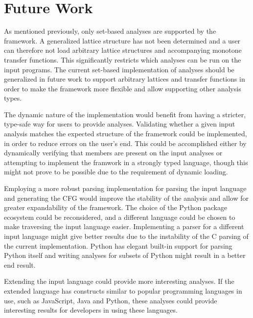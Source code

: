 \section{Future Work}
\label{futurework}

\newpar As mentioned previously, only set-based analyses are supported by the framework. A generalized lattice structure has not been determined and a user can therefore not load arbitrary lattice structures and accompanying monotone transfer functions. This significantly restricts which analyses can be run on the input programs. The current set-based implementation of analyses should be generalized in future work to support arbitrary lattices and transfer functions in order to make the framework more flexible and allow supporting other analysis types. 

\newpar The dynamic nature of the implementation would benefit from having a stricter, type-safe way for users to provide analyses. Validating whether a given input analysis matches the expected structure of the framework could be implemented, in order to reduce errors on the user's end. This could be accomplished either by dynamically verifying that members are present on the input analyses or attempting to implement the framwork in a strongly typed language, though this might not prove to be possible due to the requirement of dynamic loading.

\newpar Employing a more robust parsing implementation for parsing the input language and generating the CFG would improve the stability of the analysis and allow for greater expandability of the framework. The choice of the Python package ecosystem could be reconsidered, and a different language could be chosen to make traversing the input language easier. Implementing a parser for a different input language might give better results due to the instability of the C parsing of the current implementation. Python has elegant built-in support for parsing Python itself and writing analyses for subsets of Python might result in a better end result.

\newpar Extending the input language could provide more interesting analyses. If the extended language has constructs similar to popular programming languages in use, such as JavaScript, Java and Python\cite{github:languages}, these analyses could provide interesting results for developers in using these languages.